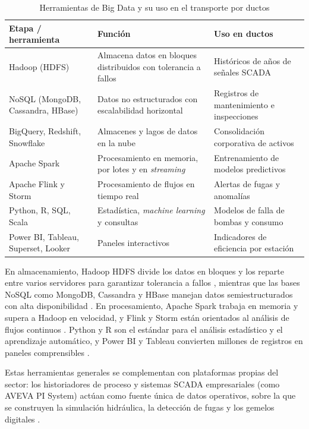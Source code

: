 \documentclass[conference]{IEEEtran}
\begin{document}
\begin{table}[!t]
\caption{Herramientas de Big Data y su uso en el transporte por ductos}
\label{tab:herramientas}
\centering
\footnotesize
\renewcommand{\arraystretch}{1.15}
\begin{tabular}{>{\raggedright\arraybackslash}p{1.9cm} >{\raggedright\arraybackslash}p{2.6cm} >{\raggedright\arraybackslash}p{2.6cm}}
\toprule
\textbf{Etapa / herramienta} & \textbf{Función} & \textbf{Uso en ductos} \\
\midrule
Hadoop (HDFS) & Almacena datos en bloques distribuidos con tolerancia a fallos & Históricos de años de señales SCADA \\
NoSQL (MongoDB, Cassandra, HBase) & Datos no estructurados con escalabilidad horizontal & Registros de mantenimiento e inspecciones \\
BigQuery, Redshift, Snowflake & Almacenes y lagos de datos en la nube & Consolidación corporativa de activos \\
\midrule
Apache Spark & Procesamiento en memoria, por lotes y en \textit{streaming} & Entrenamiento de modelos predictivos \\
Apache Flink y Storm & Procesamiento de flujos en tiempo real & Alertas de fugas y anomalías \\
\midrule
Python, R, SQL, Scala & Estadística, \textit{machine learning} y consultas & Modelos de falla de bombas y consumo \\
\midrule
Power BI, Tableau, Superset, Looker & Paneles interactivos & Indicadores de eficiencia por estación \\
\bottomrule
\end{tabular}
\end{table}

En almacenamiento, Hadoop HDFS divide los datos en bloques y los reparte entre varios servidores para garantizar tolerancia a fallos \cite{datacamp}, mientras que las bases NoSQL como MongoDB, Cassandra y HBase manejan datos semiestructurados con alta disponibilidad \cite{afi}. En procesamiento, Apache Spark trabaja en memoria y supera a Hadoop en velocidad, y Flink y Storm están orientados al análisis de flujos continuos \cite{afi, openwebinars}. Python y R son el estándar para el análisis estadístico y el aprendizaje automático, y Power BI y Tableau convierten millones de registros en paneles comprensibles \cite{datacamp}.

Estas herramientas generales se complementan con plataformas propias del sector: los historiadores de proceso y sistemas SCADA empresariales (como AVEVA PI System) actúan como fuente única de datos operativos, sobre la que se construyen la simulación hidráulica, la detección de fugas y los gemelos digitales \cite{aveva}.
\end{document}
